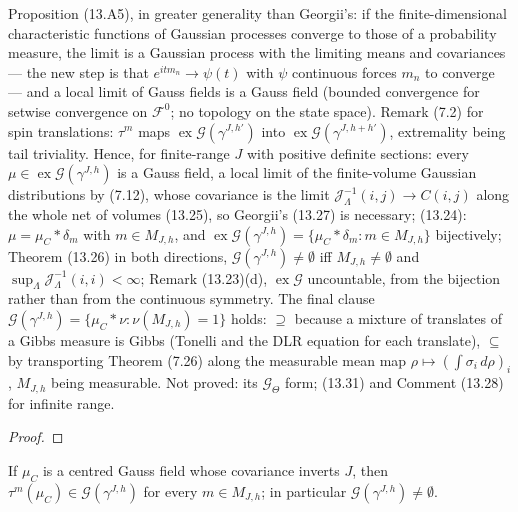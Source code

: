 \begin{theorem}
    Proposition (13.A5), in greater generality than Georgii's: if the finite-dimensional
    characteristic functions of Gaussian processes converge to those of a probability measure,
    the limit is a Gaussian process with the limiting means and covariances --- the new step is
    that $e^{itm_n} \to \psi(t)$ with $\psi$ continuous forces $m_n$ to converge --- and a local
    limit of Gauss fields is a Gauss field (bounded convergence for setwise convergence on
    $\mathcal F^0$; no topology on the state space). Remark (7.2) for spin translations: $\tau^m$
    maps $\operatorname{ex}\mathcal G(\gamma^{J,h'})$ into $\operatorname{ex}\mathcal G(\gamma^{J,h+h'})$,
    extremality being tail triviality. Hence, for finite-range $J$ with positive definite sections:
    every $\mu \in \operatorname{ex}\mathcal G(\gamma^{J,h})$ is a Gauss field, a local limit of the
    finite-volume Gaussian distributions by (7.12), whose covariance is the limit
    $\mathcal J_\Lambda^{-1}(i,j) \to C(i,j)$ along the whole net of volumes (13.25), so Georgii's
    (13.27) is necessary; (13.24): $\mu = \mu_C * \delta_m$ with $m \in M_{J,h}$, and
    $\operatorname{ex}\mathcal G(\gamma^{J,h}) = \{\mu_C * \delta_m : m \in M_{J,h}\}$ bijectively;
    Theorem (13.26) in both directions, $\mathcal G(\gamma^{J,h}) \neq \emptyset$ iff
    $M_{J,h} \neq \emptyset$ and $\sup_\Lambda \mathcal J_\Lambda^{-1}(i,i) < \infty$; Remark
    (13.23)(d), $\operatorname{ex}\mathcal G$ uncountable, from the bijection rather than from the
    continuous symmetry. The final clause $\mathcal G(\gamma^{J,h}) = \{\mu_C * \nu :
    \nu(M_{J,h}) = 1\}$ holds: $\supseteq$ because a mixture of translates of a Gibbs measure is
    Gibbs (Tonelli and the DLR equation for each translate), $\subseteq$ by transporting Theorem
    (7.26) along the measurable mean map $\rho \mapsto (\int\sigma_i\,d\rho)_i$, $M_{J,h}$ being
    measurable. Not proved: its $\mathcal G_\Theta$ form; (13.31) and Comment (13.28) for infinite
    range.
\end{theorem}
\begin{proof}
    \leanok
\end{proof}

\begin{proposition}
    \label{prop:gs-13-26}
    \leanok

    If $\mu_C$ is a centred Gauss field whose covariance inverts $J$, then
    $\tau^m(\mu_C) \in \mathcal G(\gamma^{J,h})$ for every $m \in M_{J,h}$; in particular
    $\mathcal G(\gamma^{J,h}) \neq \emptyset$.
\end{proposition}

